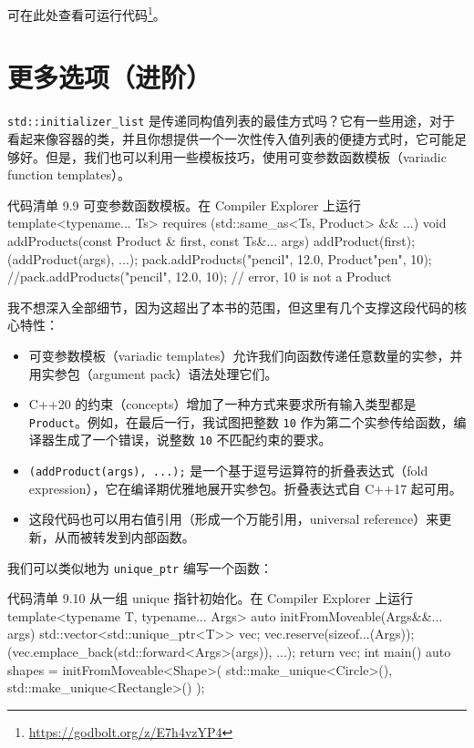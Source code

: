 可在此处查看可运行代码\footnote{\url{https://godbolt.org/z/E7h4vzYP4}}。

\section{更多选项（进阶）}

\texttt{std::initializer\_list} 是传递同构值列表的最佳方式吗？它有一些用途，对于看起来像容器的类，并且你想提供一个一次性传入值列表的便捷方式时，它可能足够好。但是，我们也可以利用一些模板技巧，使用可变参数函数模板（variadic function templates）。

\begin{codeboxt}[cpp]{代码清单 9.9 可变参数函数模板。在 Compiler Explorer 上运行}
template<typename... Ts>
requires (std::same_as<Ts, Product> && ...)
void addProducts(const Product & first, const Ts&... args) {
    addProduct(first);
    (addProduct(args), ...);
}
pack.addProducts({"pencil", 12.0}, Product{"pen", 10});
//pack.addProducts({"pencil", 12.0}, 10); // error, 10 is not a Product
\end{codeboxt}

我不想深入全部细节，因为这超出了本书的范围，但这里有几个支撑这段代码的核心特性：

\begin{itemize}
\item 可变参数模板（variadic templates）允许我们向函数传递任意数量的实参，并用实参包（argument pack）语法处理它们。
\item C++20 的约束（concepts）增加了一种方式来要求所有输入类型都是 \texttt{Product}。例如，在最后一行，我试图把整数 \texttt{10} 作为第二个实参传给函数，编译器生成了一个错误，说整数 \texttt{10} 不匹配约束的要求。
\item \texttt{(addProduct(args), ...);} 是一个基于逗号运算符的折叠表达式（fold expression），它在编译期优雅地展开实参包。折叠表达式自 C++17 起可用。
\item 这段代码也可以用右值引用（形成一个万能引用，universal reference）来更新，从而被转发到内部函数。
\end{itemize}

我们可以类似地为 \texttt{unique\_ptr} 编写一个函数：

\begin{codeboxt}[cpp]{代码清单 9.10 从一组 unique 指针初始化。在 Compiler Explorer 上运行}
template<typename T, typename... Args>
auto initFromMoveable(Args&&... args) {
    std::vector<std::unique_ptr<T>> vec;
    vec.reserve(sizeof...(Args));
    (vec.emplace_back(std::forward<Args>(args)), ...);
    return vec;
}
int main() {
    auto shapes = initFromMoveable<Shape>(
        std::make_unique<Circle>(),
        std::make_unique<Rectangle>()
    );
}
\end{codeboxt}

